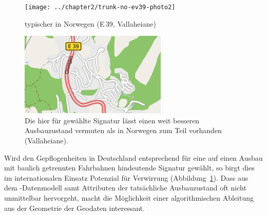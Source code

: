\documentclass[../main/thesis.tex]{subfiles}
\begin{document}
\begin{figure}[ht]
  \begin{minipage}{.5\linewidth}
    \centering
    \texttt{[image: ../chapter2/trunk-no-ev39-photo2]}
    \caption{typischer  in Norwegen (E\,39, Vallaheiane)}\label{fig:trunk-norway}
  \end{minipage}%
  \begin{minipage}{.5\linewidth}
    \centering
    \includegraphics[width=\ScaleIfNeeded]{../chapter2/trunk-no-ev39-map1}
    \caption{Die hier für  gewählte Signatur lässt einen weit besseren Ausbauzustand vermuten als in Norwegen zum Teil vorhanden (Vallaheiane).}\label{fig:trunk-norway-osm-de}
  \end{minipage}
\end{figure}


Wird den Gepflogenheiten in Deutschland entsprechend für  eine auf einen Ausbau mit baulich getrennten Fahrbahnen hindeutende Signatur gewählt, so birgt dies im internationalen Einsatz Potenzial für Verwirrung (Abbildung~\ref{fig:trunk-norway-osm-de}). Dass aus dem \osm-Datenmodell samt Attributen der tatsächliche Ausbauzustand oft nicht unmittelbar hervorgeht, macht die Möglichkeit einer algorithmischen Ableitung aus der Geometrie der Geodaten interessant.
\end{document}
